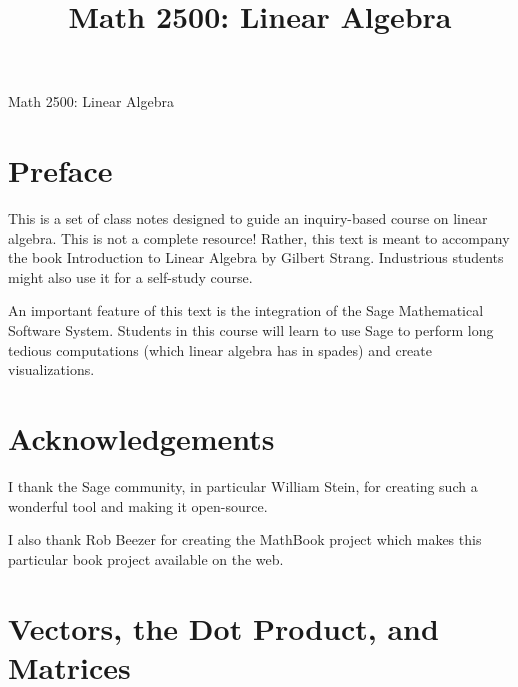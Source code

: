 \documentclass[10pt,]{book}
\title{Math 2500: Linear Algebra}
\author{}
\date{}
\theoremstyle{plain}
\theoremstyle{definition}
\numberwithin{equation}{section}
\begin{document}
\frontmatter
\thispagestyle{empty}
\begin{center}
{\Huge Math 2500: Linear Algebra}
\end{center}\par
{}
\clearpage
\thispagestyle{empty}
\clearpage
\maketitle
\clearpage
\thispagestyle{empty}
\clearpage
\setcounter{tocdepth}{1}
\renewcommand*\contentsname{Contents}
\tableofcontents
\chapter*{Preface}\label{preface-1}
This is a set of class notes designed to guide an inquiry-based course
      on linear algebra. This is not a complete resource! Rather, this text is
      meant to accompany the book Introduction to Linear Algebra by
      Gilbert Strang. Industrious students might also use it for a self-study
      course.
\par
An important feature of this text is the integration of the Sage
      Mathematical Software System. Students in this course will learn to use
      Sage to perform long tedious computations (which linear algebra has in
      spades) and create visualizations.
\chapter*{Acknowledgements}\label{acknowledgement-1}
I thank the Sage community, in particular William Stein, for creating
      such a wonderful tool and making it open-source.
\par
I also thank Rob Beezer for creating the MathBook project which makes
      this particular book project available on the web.
\mainmatter
\typeout{************************************************}
\typeout{************************************************}
\chapter[Vectors, the Dot Product, and Matrices]{Vectors, the Dot Product, and Matrices}\label{chapter-basic-objects}
\end{document}
